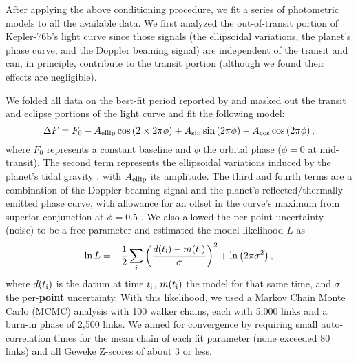 \documentclass[manuscript]{aastex62}
\begin{document}
After applying the above conditioning procedure, we fit a series of photometric models to all the available data. We first analyzed the out-of-transit portion of Kepler-76b's light curve since those signals (the ellipsoidal variations, the planet's phase curve, and the Doppler beaming signal) are independent of the transit and can, in principle, contribute to the transit portion (although we found their effects are negligible). 

We folded all data on the best-fit period reported by \citet{2013ApJ...771...26F} and masked out the transit and eclipse portions of the light curve and fit the following model:
\begin{equation}
    \Delta F = F_0 - A_{\rm ellip} \cos \left(2\times2\pi\phi \right) + A_{\rm sin} \sin \left(2 \pi\phi \right) - A_{\rm cos} \cos \left(2\pi \phi \right),
\label{eqn:BEER_curve}
\end{equation}
where $F_0$ represents a constant baseline and $\phi$ the orbital phase ($\phi = 0$ at mid-transit). The second term represents the ellipsoidal variations induced by the planet's tidal gravity \citep{2010ApJ...713L.145W}, with $A_{\rm ellip}$ its amplitude. The third and fourth terms are a combination of the Doppler beaming signal \citep{2003ApJ...588L.117L} and the planet's reflected/thermally emitted phase curve, with allowance for an offset in the curve's maximum from superior conjunction at $\phi = 0.5$ \citep{2013ApJ...771...26F}. We also allowed the per-point uncertainty (noise) to be a free parameter and estimated the model likelihood $L$ as
\begin{equation}
    \ln L = -\frac{1}{2} \sum_i \bigg( \frac{ d(t_{\rm i}) - m(t_{\rm i}) }{\sigma} \bigg)^2 + \ln \left( 2 \pi \sigma^2 \right),
    \label{eqn:likelihood}
\end{equation}
where $d(t_{\rm i})$ is the datum at time $t_{\rm i}$, $m(t_{\rm i})$ the model for that same time, and $\sigma$ the per-\textbf{point} uncertainty. With this likelihood, we used a Markov Chain Monte Carlo (MCMC) analysis \citep{2013PASP..125..306F} with 100 walker chains, each with 5,000 links and a burn-in phase of 2,500 links. We aimed for convergence by requiring small auto-correlation times \citep[e.g.,][]{geyer1992} for the mean chain of each fit parameter (none exceeded 80 links) and all Geweke Z-scores \citep{Geweke92evaluatingthe} of about 3 or less. 
\end{document}
